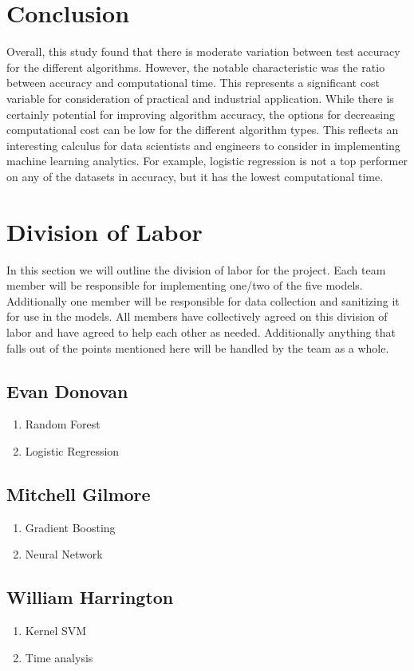 \documentclass[10pt,twocolumn,letterpaper]{article}
\begin{document}
\section{Conclusion}

Overall, this study found that there is moderate variation between test accuracy for the different algorithms.
However, the notable characteristic was the ratio between accuracy and computational time.
This represents a significant cost variable for consideration of practical and industrial application.
While there is certainly potential for improving algorithm accuracy, the options for decreasing computational cost can be low for the different algorithm types.
This reflects an interesting calculus for data scientists and engineers to consider in implementing machine learning analytics.
For example, logistic regression is not a top performer on any of the datasets in accuracy, but it has the lowest computational time.

\section{Division of Labor}

In this section we will outline the division of labor for the project.
Each team member will be responsible for implementing one/two of the five models.
Additionally one member will be responsible for data collection and sanitizing it for use in the models.
All members have collectively agreed on this division of labor and have agreed to help each other as needed.
Additionally anything that falls out of the points mentioned here will be handled by the team as a whole.

\subsection{Evan Donovan}
\begin{enumerate}
  \item Random Forest
  \item Logistic Regression
\end{enumerate}

\subsection{Mitchell Gilmore}
\begin{enumerate}
  \item Gradient Boosting
  \item Neural Network
\end{enumerate}

\subsection{William Harrington}
\begin{enumerate}
  \item Kernel SVM
  \item Time analysis
\end{enumerate}

{
  \small
  
  
}
\end{document}
